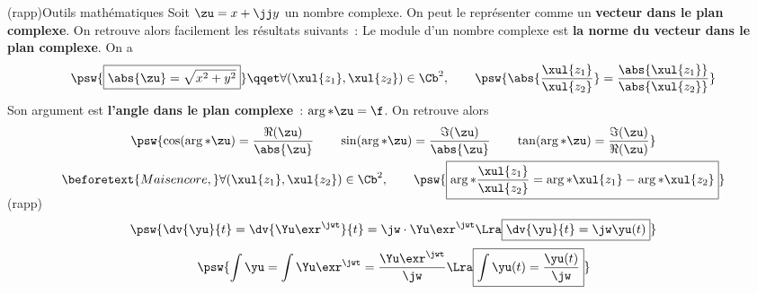\documentclass[../../main/main.tex]{subfiles}
\begin{document}
\begin{tcb*}[breakable](rapp){Outils mathématiques}
	Soit $\zu = x + \jj y$ un nombre complexe. On peut le représenter comme un
	\textbf{vecteur dans le plan complexe}. On retrouve alors facilement les
	résultats suivants~:
	Le module d'un nombre complexe est \textbf{la norme du vecteur dans le plan
		complexe}. On a
	\[
		\psw{%
			\boxed{\abs{\zu} = \sqrt{x^2 + y^2}}
		}%
		\qqet
		\forall (\xul{z_1}, \xul{z_2}) \in \Cb^2,
		\qquad
		\psw{%
			\abs{\frac{\xul{z_1}}{\xul{z_2}}} =
			\frac{\abs{\xul{z_1}}}{\abs{\xul{z_2}}}
		}%
	\]
	Son argument est \textbf{l'angle dans le plan complexe}~:
	$\arg*{\zu} = \f$. On retrouve alors
	\begin{gather*}
		\psw{%
			\cos(\arg*{\zu}) = \frac{\Re(\zu)}{\abs{\zu}}
			\qquad
			\sin(\arg*{\zu}) = \frac{\Im(\zu)}{\abs{\zu}}
			\qquad
			\tan(\arg*{\zu}) = \frac{\Im(\zu)}{\Re(\zu)}
		}%
		\\\beforetext{Mais encore,}
		\forall (\xul{z_1}, \xul{z_2}) \in \Cb^2,
		\qquad
		\psw{%
			\boxed{
				\arg*{ \frac{\xul{z_1}}{\xul{z_2}} } =
				\arg*{\xul{z_1}} - \arg*{\xul{z_2}}
			}%
		}%
		\vspace{-15pt}
	\end{gather*}
	\begin{isd}(rapp)
		\vspace{-10pt}
		\[
			\psw{%
				\dv{\yu}{t} = \dv{\Yu\exr^{\jwt}}{t} = \jw \cdot \Yu\exr^{\jwt}
				\Lra
				\boxed{\dv{\yu}{t} = \jw \yu(t)}
			}
		\]
		\tcblower
		\vspace{-10pt}
		\[
			\psw{%
				\int \yu = \int \Yu\exr^{\jwt} = \frac{\Yu\exr^{\jwt}}{\jw}
				\Lra
				\boxed{\int \yu(t) = \frac{\yu(t)}{\jw}}
			}
		\]
	\end{isd}
\end{tcb*}
\end{document}
